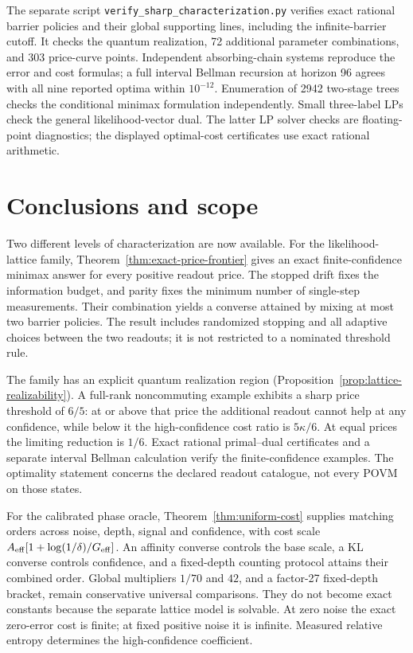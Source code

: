\documentclass[11pt,a4paper]{article}
\theoremstyle{definition}
\theoremstyle{remark}
\numberwithin{equation}{section}
\begin{document}
The separate script \texttt{verify\_sharp\_characterization.py} verifies
exact rational barrier policies and their global supporting lines,
including the infinite-barrier cutoff. It checks the quantum realization,
72 additional parameter combinations, and 303 price-curve points.
Independent absorbing-chain systems reproduce the error and cost formulas;
a full interval Bellman recursion at horizon 96 agrees with all nine
reported optima within $10^{-12}$. Enumeration of 2942 two-stage trees
checks the conditional minimax formulation independently. Small three-label
LPs check the general likelihood-vector dual. The latter LP solver checks
are floating-point diagnostics; the displayed optimal-cost certificates
use exact rational arithmetic.
\FloatBarrier

\section{Conclusions and scope}
Two different levels of characterization are now available. For the
likelihood-lattice family, Theorem~\ref{thm:exact-price-frontier} gives
an exact finite-confidence minimax answer for every positive readout
price. The stopped drift fixes the information budget, and parity fixes
the minimum number of single-step measurements. Their combination yields
a converse attained by mixing at most two barrier policies. The result
includes randomized stopping and all adaptive choices between the two
readouts; it is not restricted to a nominated threshold rule.

The family has an explicit quantum realization region
(Proposition~\ref{prop:lattice-realizability}). A full-rank noncommuting
example exhibits a sharp price threshold of $6/5$: at or above that
price the additional readout cannot help at any confidence, while below
it the high-confidence cost ratio is $5\kappa/6$. At equal prices the
limiting reduction is $1/6$. Exact rational primal--dual certificates
and a separate interval Bellman calculation verify the finite-confidence
examples. The optimality statement concerns the declared readout catalogue,
not every POVM on those states.

For the calibrated phase oracle, Theorem~\ref{thm:uniform-cost} supplies
matching orders across noise, depth, signal and confidence, with cost
scale $A_{\rm eff}[1+\log(1/\delta)/G_{\rm eff}]$. An affinity converse
controls the base scale, a KL converse controls confidence, and a
fixed-depth counting protocol attains their combined order. Global
multipliers $1/70$ and $42$, and a factor-27 fixed-depth bracket, remain
conservative universal comparisons. They do not become exact constants
because the separate lattice model is solvable. At zero noise the
exact zero-error cost is finite; at fixed positive noise it is infinite.
Measured relative entropy determines the high-confidence coefficient.
\end{document}
